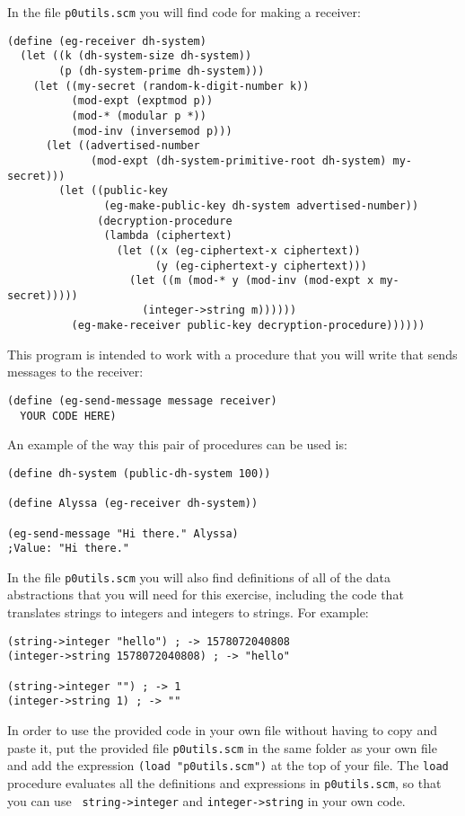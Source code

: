 In the file {\tt p0utils.scm} you will find code for making a receiver:
\begin{verbatim}
(define (eg-receiver dh-system)
  (let ((k (dh-system-size dh-system))
        (p (dh-system-prime dh-system)))
    (let ((my-secret (random-k-digit-number k))
          (mod-expt (exptmod p))
          (mod-* (modular p *))
          (mod-inv (inversemod p)))
      (let ((advertised-number
             (mod-expt (dh-system-primitive-root dh-system) my-secret)))
        (let ((public-key
               (eg-make-public-key dh-system advertised-number))
              (decryption-procedure
               (lambda (ciphertext)
                 (let ((x (eg-ciphertext-x ciphertext))
                       (y (eg-ciphertext-y ciphertext)))
                   (let ((m (mod-* y (mod-inv (mod-expt x my-secret)))))
                     (integer->string m))))))
          (eg-make-receiver public-key decryption-procedure))))))
\end{verbatim}

This program is intended to work with a procedure that you will write
that sends messages to the receiver:
\begin{verbatim}
(define (eg-send-message message receiver)
  YOUR CODE HERE)
\end{verbatim}
An example of the way this pair of procedures can be used is:
\begin{verbatim}
(define dh-system (public-dh-system 100))

(define Alyssa (eg-receiver dh-system))

(eg-send-message "Hi there." Alyssa)
;Value: "Hi there."
\end{verbatim}

In the file {\tt p0utils.scm} you will also find definitions of all of the
data abstractions that you will need for this exercise, including the
code that translates strings to integers and integers to strings.
For example:

\begin{verbatim}
(string->integer "hello") ; -> 1578072040808
(integer->string 1578072040808) ; -> "hello"

(string->integer "") ; -> 1
(integer->string 1) ; -> ""
\end{verbatim}

In order to use the provided code in your own file without having to
copy and paste it, put the provided file {\tt p0utils.scm} in the same
folder as your own file and add the expression {\tt (load "p0utils.scm")}
at the top of your file.  The {\tt load} procedure evaluates all the
definitions and expressions in {\tt p0utils.scm}, so that you can use {\tt
string->integer} and {\tt integer->string} in your own code.


